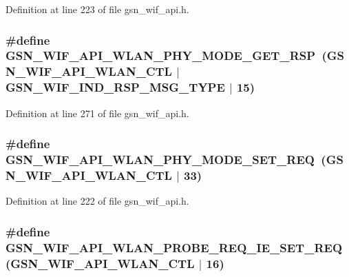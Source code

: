 Definition at line 223 of file gsn\_\-wif\_\-api.h.

\hypertarget{a00606_a9c7f8ddfa90f9193ba9e4687e49849f8}{
\subsubsection[{GSN\_\-WIF\_\-API\_\-WLAN\_\-PHY\_\-MODE\_\-GET\_\-RSP}]{\setlength{\rightskip}{0pt plus 5cm}\#define GSN\_\-WIF\_\-API\_\-WLAN\_\-PHY\_\-MODE\_\-GET\_\-RSP~(GSN\_\-WIF\_\-API\_\-WLAN\_\-CTL $|$ GSN\_\-WIF\_\-IND\_\-RSP\_\-MSG\_\-TYPE $|$ 15)}}
\label{a00606_a9c7f8ddfa90f9193ba9e4687e49849f8}


Definition at line 271 of file gsn\_\-wif\_\-api.h.

\hypertarget{a00606_a1b9369f2e6e36e28f622f648eea3386f}{
\subsubsection[{GSN\_\-WIF\_\-API\_\-WLAN\_\-PHY\_\-MODE\_\-SET\_\-REQ}]{\setlength{\rightskip}{0pt plus 5cm}\#define GSN\_\-WIF\_\-API\_\-WLAN\_\-PHY\_\-MODE\_\-SET\_\-REQ~(GSN\_\-WIF\_\-API\_\-WLAN\_\-CTL $|$ 33)}}
\label{a00606_a1b9369f2e6e36e28f622f648eea3386f}


Definition at line 222 of file gsn\_\-wif\_\-api.h.

\hypertarget{a00606_a5029cbbdeeb8c7da8893c2447e44a19f}{
\subsubsection[{GSN\_\-WIF\_\-API\_\-WLAN\_\-PROBE\_\-REQ\_\-IE\_\-SET\_\-REQ}]{\setlength{\rightskip}{0pt plus 5cm}\#define GSN\_\-WIF\_\-API\_\-WLAN\_\-PROBE\_\-REQ\_\-IE\_\-SET\_\-REQ~(GSN\_\-WIF\_\-API\_\-WLAN\_\-CTL $|$ 16)}}
\label{a00606_a5029cbbdeeb8c7da8893c2447e44a19f}


